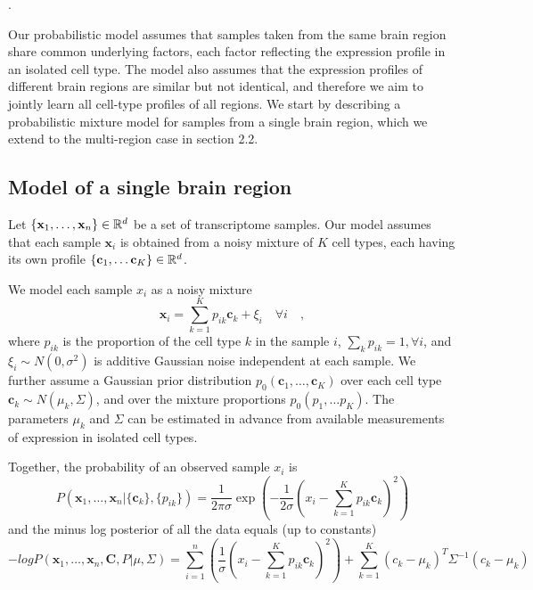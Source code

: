 
\newcommand{\x}{\mathbf{x}}
\renewcommand{\c}{\mathbf{c}}
\renewcommand{\H}{\mathbf{C}}
\newcommand{\Htext}{{C}}
\newcommand{\paren}[1]{\left({#1}\right)}
\newcommand{\brackets}[1]{\left[{#1}\right]}
\newcommand{\norm}[1]{\|{#1}\|}
\newcommand{\argmin}{\operatornamewithlimits{argmin}}.

Our probabilistic model assumes that samples taken from the same brain region share common underlying factors, each factor reflecting the expression profile in an isolated cell type. The model also assumes that the expression profiles of different brain regions are similar but not identical, and therefore we aim to jointly learn all cell-type profiles of all regions. We start by describing a  probabilistic mixture model for samples from a single brain region, which we extend to the multi-region case in section 2.2.

\subsection{Model of a single brain region}
Let $\{\x_1, \ldots, \x_n\} \in \reals^d$ be a set of transcriptome samples. Our model assumes that each sample $\x_i$ is obtained from a noisy mixture of $K$ cell types, each having its own profile $\{\c_1, \ldots \c_K \}\in \reals^d$.

We model each sample $x_i$ as a noisy mixture
\begin{equation*}
 \x_i = \sum_{k=1}^K p_{ik} \c_k + \xi_i \quad\forall i \quad,
\end{equation*}
where $p_{ik}$ is the proportion of the cell type $k$ in the sample $i$, $\sum_k p_{ik} = 1, \forall i$, and $\xi_i \sim N(0,\sigma^2)$ is additive Gaussian noise independent at each sample. We further assume a Gaussian prior distribution $p_0( \c_1, \ldots, \c_K)$ over each cell type $ \c_k  \sim N(\mu_k, \Sigma) $, and over the mixture proportions $p_0(p_1, \ldots p_K)$. The parameters $\mu_k$ and $\Sigma$ can be estimated in advance from available measurements of expression in isolated cell types.

Together, the probability of an observed sample $x_i$ is
\begin{equation*}
    P(\x_1,\ldots,\x_n | \{\c_k\}, \{p_{ik}\}) =  \frac{1}{2\pi\sigma} \exp\left(-\frac{1}{2\sigma} (x_i - \sum_{k=1}^K p_{ik} \c_k)^2 \right)
\end{equation*}
and the minus log posterior of all the data equals (up to constants)
\begin{equation*}
    - log P(\x_1,\ldots,\x_n, \H, P| \mu, \Sigma) =
    \sum_{i=1}^n \paren{ \frac{1}{\sigma} (x_i - \sum_{k=1}^K p_{ik} \c_k)^2 }
     + \sum_{k=1}^K (c_k-\mu_k)^T\Sigma^{-1}(c_k-\mu_k)
\end{equation*}

